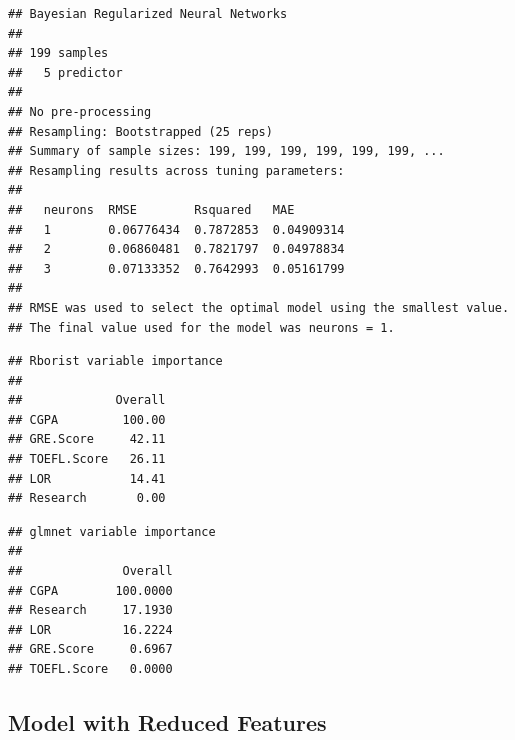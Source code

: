 \documentclass[11pt,]{article}
\newenvironment{Shaded}{\begin{snugshade}}{\end{snugshade}}
\newcommand{\KeywordTok}[1]{\textcolor[rgb]{0.13,0.29,0.53}{\textbf{#1}}}
\newcommand{\NormalTok}[1]{#1}
\newcommand{\OperatorTok}[1]{\textcolor[rgb]{0.81,0.36,0.00}{\textbf{#1}}}
\begin{document}
\begin{Shaded}
\end{Shaded}

\begin{verbatim}
## Bayesian Regularized Neural Networks 
## 
## 199 samples
##   5 predictor
## 
## No pre-processing
## Resampling: Bootstrapped (25 reps) 
## Summary of sample sizes: 199, 199, 199, 199, 199, 199, ... 
## Resampling results across tuning parameters:
## 
##   neurons  RMSE        Rsquared   MAE       
##   1        0.06776434  0.7872853  0.04909314
##   2        0.06860481  0.7821797  0.04978834
##   3        0.07133352  0.7642993  0.05161799
## 
## RMSE was used to select the optimal model using the smallest value.
## The final value used for the model was neurons = 1.
\end{verbatim}

\begin{Shaded}
\end{Shaded}

\begin{verbatim}
## Rborist variable importance
## 
##             Overall
## CGPA         100.00
## GRE.Score     42.11
## TOEFL.Score   26.11
## LOR           14.41
## Research       0.00
\end{verbatim}

\begin{Shaded}
\end{Shaded}

\begin{verbatim}
## glmnet variable importance
## 
##              Overall
## CGPA        100.0000
## Research     17.1930
## LOR          16.2224
## GRE.Score     0.6967
## TOEFL.Score   0.0000
\end{verbatim}

\hypertarget{model-with-reduced-features}{%
\subsection{Model with Reduced
Features}\label{model-with-reduced-features}}
\end{document}
